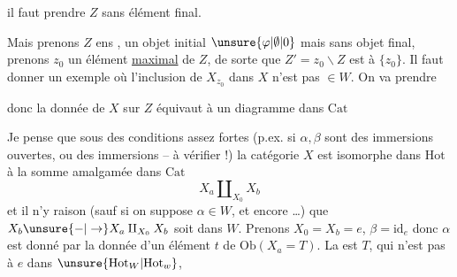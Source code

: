 
il faut prendre $Z$ sans élément final. 

Mais prenons $Z$ ens ,   un objet initial $\unsure{\varphi|\emptyset|0}$ mais sans objet final,   prenons  $z_0$ un élément \uline{maximal} de $Z$, de sorte que $Z'=z_0\backslash Z$ est  à $\{z_0\}$. Il faut donner  un exemple où l'inclusion de $X_{z_0}$ dans $X$ n'est pas $\in W$. On va prendre


donc la donnée de $X$   sur $Z$ équivaut à un diagramme dans $\mathrm{Cat}$


Je pense que sous des conditions assez fortes (p.ex. si $\alpha,\beta$ sont des immersions ouvertes, ou des immersions  -- à vérifier !) la catégorie $X$ est isomorphe dans $\mathrm{Hot}$ à la somme amalgamée dans $\mathrm{Cat}$
\[
X_a\amalg_{X_0}X_b
\]
et il n'y  raison (sauf si on suppose $\alpha\in W$, et encore \ldots) que $X_b\unsure{\mathbin{-}|\to}X_a\amalg_{X_0}X_b$ soit dans $W$. Prenons $X_0=X_b=e$, $\beta=\mathrm{id}_e$ donc $\alpha$ est donné par la donnée d'un élément $t$ de $\mathrm{Ob}(X_a=T)$. La   est $T$, qui n'est pas  à $e$ dans $\unsure{\mathrm{Hot}_{W}|\mathrm{Hot}_{w}}$,

